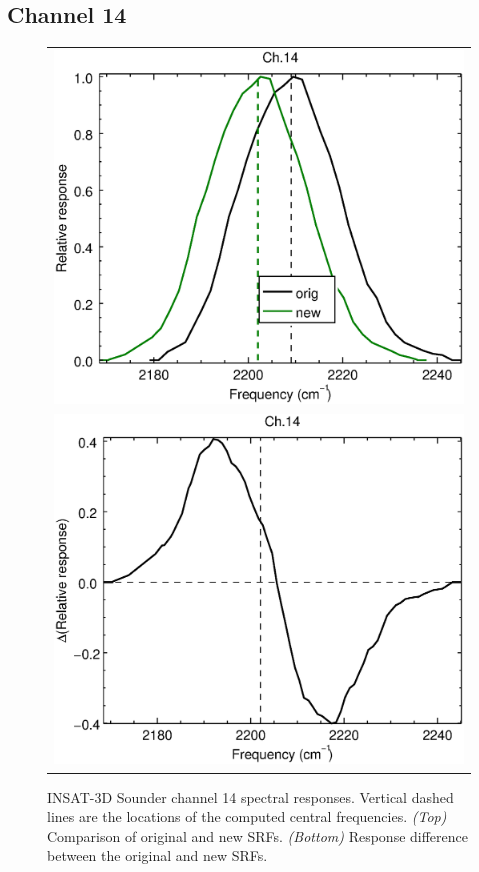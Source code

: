 \subsection{Channel 14}
\begin{figure}[H]
  \centering
  \begin{tabular}{c}
    \includegraphics[scale=0.55]{graphics/sndr/srf/sndr_insat3d-14.eps} \\
    \includegraphics[scale=0.55]{graphics/sndr/srf/sndr_insat3d-14.difference.eps}
  \end{tabular}
  \caption{INSAT-3D Sounder channel 14 spectral responses. Vertical dashed lines are the locations of the computed central frequencies. \emph{(Top)} Comparison of original and new SRFs. \emph{(Bottom)} Response difference between the original and new SRFs.}
  \label{fig:sndr_ch14}
\end{figure}

